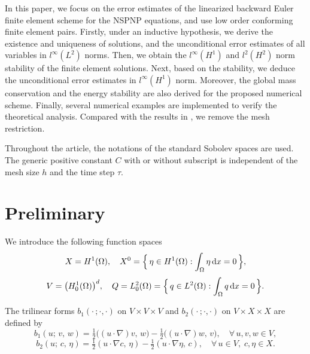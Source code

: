 \documentclass[a4paper,fleqn]{cas-sc}
\numberwithin{equation}{section}
\theoremstyle{definition}
\begin{document}
In this paper, we focus on the error estimates of the linearized backward Euler finite element scheme for the NSPNP equations, and use low order conforming finite element pairs. Firstly, under an inductive hypothesis, we derive the existence and uniqueness of solutions, and the unconditional error estimates of all variables in $l^\infty(L^2)$ norms. Then, we obtain the $l^\infty(H^1)$ and $l^2(H^2)$ norm stability of the finite element solutions. Next, based on the stability, we deduce the unconditional error estimates in $l^\infty(H^1)$ norm. Moreover, the global mass conservation and the energy stability are also derived for the proposed numerical scheme. Finally, several numerical examples are implemented to verify the theoretical analysis. Compared with the results in \cite{Sun2016,He22017,He32018,He42021,Shi2019,Shi22021,Yang22022}, we remove the mesh restriction.

Throughout the article, the notations of the standard Sobolev spaces are used. The generic positive constant $C$ with or without subscript is independent of the mesh size $h$ and the time step $\tau$.

\section{Preliminary}
\label{sec:preliminary}

We introduce the following function spaces
\begin{equation}
  X = H^{1}(\Omega),\quad
  X^{0} = \Bigl\{\,\eta\in H^{1}(\Omega) : \int_{\Omega}\eta\,\mathrm{d}x = 0\,\Bigr\},
  \label{eq:2.1}
\end{equation}
\begin{equation}
  V = \bigl(H^{1}_{0}(\Omega)\bigr)^{d},\quad
  Q = L^{2}_{0}(\Omega) = \Bigl\{\,q\in L^{2}(\Omega) : \int_{\Omega}q\,\mathrm{d}x = 0\,\Bigr\}.
  \label{eq:2.2}
\end{equation}

The trilinear forms $b_{1}(\cdot\,;\cdot,\cdot)$ on $V\times V\times V$ and
$b_{2}(\cdot\,;\cdot,\cdot)$ on $V\times X\times X$ are defined by
\begin{equation}
  b_{1}(u;\,v,\,w)
  = \tfrac{1}{2}\bigl((u\cdot\nabla)v,\,w\bigr)
  - \tfrac{1}{2}\bigl((u\cdot\nabla)w,\,v\bigr),
  \quad \forall\,u,v,w\in V,
  \label{eq:2.3}
\end{equation}
\begin{equation}
  b_{2}(u;\,c,\,\eta)
  = \tfrac{1}{2}(u\cdot\nabla c,\,\eta)
  - \tfrac{1}{2}(u\cdot\nabla\eta,\,c),
  \quad \forall\,u\in V,\;c,\eta\in X.
  \label{eq:2.4}
\end{equation}
\end{document}
